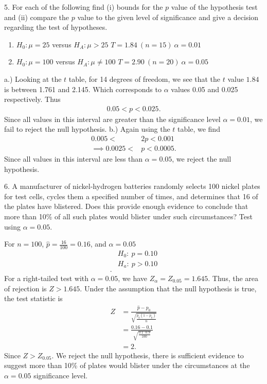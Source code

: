 \documentclass{report}
\begin{document}
\pagebreak \bigbreak \noindent 
\begin{mdframed}
5. For each of the following find (i) bounds for the $p$ value of the hypothesis test and (ii) compare the $p$ value to the given level of significance and give a decision regarding the test of hypotheses.
    \begin{enumerate}[label=(\alph*)]
        \item $H_0 : \mu = 25$ versus $H_A : \mu > 25$ \hfill $T = 1.84 \ (n=15) \ \alpha = 0.01$
        \item $H_0 : \mu = 100$ versus $H_A : \mu \neq 100$ \hfill $T = 2.90 \ (n=20) \ \alpha = 0.05$
    \end{enumerate}
\end{mdframed}
\bigbreak \noindent 
a.) Looking at the $t$ table, for 14 degrees of freedom, we see that the $t$ value $1.84$ is between 1.761 and 2.145. Which corresponds to $\alpha$ values 0.05 and 0.025 respectively. Thus
\begin{align*}
    0.05 < p < 0.025    
.\end{align*}
Since all values in this interval are greater than the significance level $\alpha=0.01$, we fail to reject the null hypothesis.
\bigbreak \noindent 
b.) Again using the $t$ table, we find
\begin{align*}
    0.005 < &2p < 0.001  \\
    \implies 0.0025 < &p < 0.0005
.\end{align*}
\bigbreak \noindent 
Since all values in this interval are less than $\alpha =0.05$, we reject the null hypothesis.

\pagebreak \bigbreak \noindent 
\begin{mdframed}
6. A manufacturer of nickel-hydrogen batteries randomly selects 100 nickel plates for test cells, cycles them a specified number of times, and determines that 16 of the plates have blistered. Does this provide enough evidence to conclude that more than 10\% of all such plates would blister under such circumstances? Test using $\alpha = 0.05$.
\end{mdframed}
\bigbreak \noindent 
For $n=100$, $\hat{p} = \frac{16}{100} = 0.16$, and $\alpha = 0.05 $
\begin{align*}
    &H_{0}:\ p = 0.10 \\
    &H_{a}:\ p > 0.10 \\
.\end{align*}
\bigbreak \noindent 
For a right-tailed test with $\alpha=0.05$, we have $Z_{\alpha} = Z_{0.05} = 1.645$. Thus, the area of rejection is $Z > 1.645$. Under the assumption that the null hypothesis is true, the test statistic is
\begin{align*}
    Z &= \frac{\hat{p} - p_{0}}{\sqrt{\frac{p_{0}(1-p_{0})}{n}}} \\
    &=\frac{0.16 - 0.1}{\sqrt{\frac{0.1 \cdot 0.9}{100}}} \\
    &=2
.\end{align*}
\bigbreak \noindent 
Since $Z > Z_{0.05}$. We reject the null hypothesis, there is sufficient evidence to suggest more than 10\% of plates would blister under the circumstances at the $\alpha=0.05$ significance level.
\end{document}
